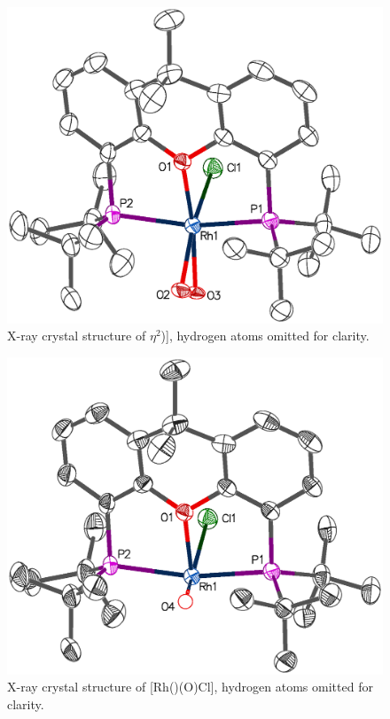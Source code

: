 \begin{figure}[htbp]
\begin{center}
\includegraphics[scale=0.55]{../Crystalstructures/MRMN-Ga-dioxygen.eps}
\caption[X-ray crystal structure of \ce{[Rh(tBu-xantphos)Cl(}$\eta^2$){]}]{X-ray crystal structure of \ce{[Rh(tBu-xantphos)Cl(}$\eta^2$)], hydrogen atoms omitted for clarity.}
\label{Crystal:rhodium}
\end{center}
\end{figure}

\begin{figure}[hbtp]
\begin{center}
\includegraphics[scale=0.55]{../Crystalstructures/MRMN-Ga-oxo.eps}
\caption[X-ray crystal structure of [Rh(\tBuxantphosk)Cl(O)]{X-ray crystal structure of [Rh(\tBuxantphosk)(O)Cl], hydrogen atoms omitted for clarity.}
\label{Crystal:rhodiumoxo}
\end{center}
\end{figure}

